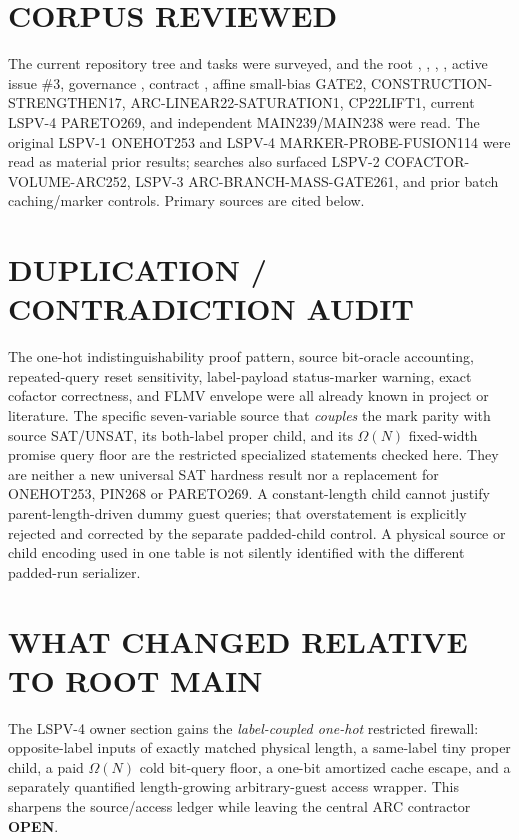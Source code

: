 \documentclass[11pt]{article}
\begin{document}
\section{CORPUS REVIEWED}
The current repository tree and tasks were surveyed, and the root , , , , active issue \#3, governance , contract , affine small-bias GATE2, CONSTRUCTION-STRENGTHEN17, ARC-LINEAR22-SATURATION1, CP22LIFT1, current LSPV-4 PARETO269, and independent MAIN239/MAIN238 were read. The original LSPV-1 ONEHOT253 and LSPV-4 MARKER-PROBE-FUSION114 were read as material prior results; searches also surfaced LSPV-2 COFACTOR-VOLUME-ARC252, LSPV-3 ARC-BRANCH-MASS-GATE261, and prior batch caching/marker controls. Primary sources are cited below.

\section{DUPLICATION / CONTRADICTION AUDIT}
The one-hot indistinguishability proof pattern, source bit-oracle accounting, repeated-query reset sensitivity, label-payload status-marker warning, exact cofactor correctness, and FLMV envelope were all already known in project or literature. The specific seven-variable source that \emph{couples} the mark parity with source SAT/UNSAT, its both-label proper child, and its $\Omega(N)$ fixed-width promise query floor are the restricted specialized statements checked here. They are neither a new universal SAT hardness result nor a replacement for ONEHOT253, PIN268 or PARETO269. A constant-length child cannot justify parent-length-driven dummy guest queries; that overstatement is explicitly rejected and corrected by the separate padded-child control. A physical source or child encoding used in one table is not silently identified with the different padded-run serializer.

\section{WHAT CHANGED RELATIVE TO ROOT MAIN}
The LSPV-4 owner section gains the \emph{label-coupled one-hot} restricted firewall: opposite-label inputs of exactly matched physical length, a same-label tiny proper child, a paid $\Omega(N)$ cold bit-query floor, a one-bit amortized cache escape, and a separately quantified length-growing arbitrary-guest access wrapper. This sharpens the source/access ledger while leaving the central ARC contractor \textbf{OPEN}.
\end{document}
